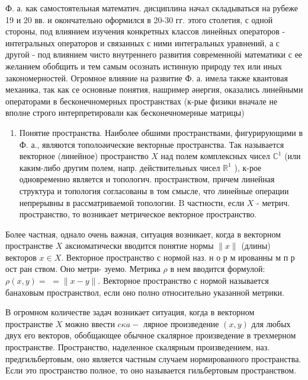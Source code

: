 \documentclass[10pt]{article}
\begin{document}
Ф. а. как самостоятельная математич. дисциплина начал складываться на рубеже 19 и 20 вв. и окончательно оформился в 20-30 гг. этого столетия, с одной стороны, под влиянием изучения конкретных классов линейных операторов - интегральных операторов и связанных с ними интегральных уравнений, а с другой - под влиянием чисто внутреннего развития современнойі математики с ее желанием обобщить и тем самым осознать истинную природу тех или иных закономерностей. Огромное влияние на развитие Ф. а. имела также квантовая механика, так как се основные понятия, нашример әнергия, оказались линейными операторами в бесконечномерных пространствах (к-рые физики вначале не вполне строго интерпретировали как бесконечномерные матрицы)



\begin{enumerate}

  \item Понятие пространства. Наиболее обшими пространствами, фигурирующими в Ф. а., являются тополоәические векторные пространства. Так называется векторное (линейное) пространство $X$ над полем комплексных чисел $\mathbb{C}^{1}$ (или каким-либо другим полем, напр. действительных чисел $\mathbb{R}^{1}$ ), к-рое одновременно является и топологич. пространством, причем линейная структура и топология согласованы в том смысле, что линейные операции непрерывны в рассматриваемой топологии. $\mathrm{B}$ частности, если $X$ - метрич. пространство, то возникает метрическое векторное пространство.

\end{enumerate}



Более частная, однало очень важная, ситуация возникает, когда в векторном пространстве $X$ аксиоматически вводится понятие нормы $\|x\|$ (длины) векторов $x \in X$. Векторное пространство с нормой наз. н о р м ированны $м$ п р ост ран ством. Оно метри- зуемо. Метрика $\rho$ в нем вводится формулой: $\rho(x, y)=$ $=\|x-y\|$. Векторное пространство с нормой называется банаховым пространствол, если оно полно относительно указанной метрики.



В огромном количестве задач возникает ситуация, когда в векторном пространстве $X$ можно ввести $c \kappa a-$ лярное произведение $(x, y)$ для любых двух его векторов, обобщающее обычное скалярное произведение в трехмерном пространстве. Пространство, наделенное скалярным произведением, наз. предгильбертовым, оно является частным случаем нормированного пространства. Если это пространство полное, то оно называется гильбертовым пространством.
\end{document}
